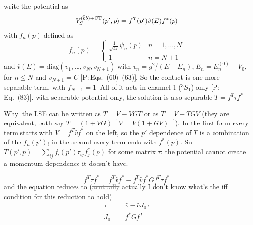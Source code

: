 \documentclass[11pt]{article}
\newcommand{\tagP}[1]{\textcolor{blue!65!black}{\textsf{\small[P:\,#1]}}}
\newcommand{\ai}[1]{\textcolor{aicolor}{#1}}
\newcommand{\aifix}[2]{\textcolor{gray}{\sout{#1}} \textcolor{aicolor}{#2}}
\newcommand{\ai}[1]{#1}
\newcommand{\aifix}[2]{#2}
\newenvironment{aiadd}{\par}{\par}
\begin{document}
write the potential as
\[
	V_S^{(\bar b b) + \rm{CT}}(p',p) = f^T(p')\hat v (E) f^*(p)
\]
with $f_n(p)$ defined as
\[
	f_n(p) = \begin{cases}
		\frac{1}{\sqrt{4\pi}}\psi_n(p) & n = 1,\dots,N \\
		1                              & n = N+1
	\end{cases}
\]
\ai{and $\hat v(E)=\text{diag}(v_1,\dots,v_N,v_{N+1})$ with $v_n=g^2/(E-E_n)$, $E_n=E_n^{(0)}+V_0$, for $n\le N$ and $v_{N+1}=C$ \tagP{Eqs.~(60)--(63)}. So the contact is one more separable term, with $f_{N+1}=1$. All of it acts in channel 1 ($^3S_1$) only \tagP{Eq.~(83)}.}
with separable potential only, the solution is also separable $T = f^T \tau f^*$
\begin{aiadd}
	Why: the LSE can be written as $T=V-VGT$ or as $T=V-TGV$ (they are equivalent; both say $T=(1+VG)^{-1}V=V(1+GV)^{-1}$). In the first form every term starts with $V=f^T\hat vf^*$ on the left, so the $p'$ dependence of $T$ is a combination of the $f_n(p')$; in the second every term ends with $f^*(p)$. So $T(p',p)=\sum_{ij}f_i(p')\tau_{ij}f^*_j(p)$ for some matrix $\tau$: the potential cannot create a momentum dependence it doesn't have.
\end{aiadd}
\[
	f^T \tau f^* = f^T \hat v f^* - f^T \hat v f^* G f^T \tau f^*
\]
and the equation reduces to (\aifix{acutually}{actually} I don't know what's the iff condition for this reduction to hold)
\begin{align}
	\tau & = \hat v - \hat v J_0 \tau \\
	J_0  & = f^* G f^T
\end{align}
\end{document}
